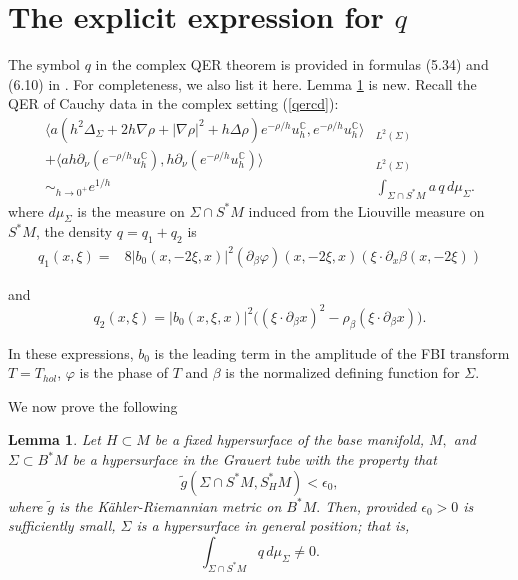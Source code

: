 \documentclass[11pt,reqno]{amsart}
\newtheorem{lemma}[theorem]{Lemma}
\theoremstyle{definition}
\begin{document}
\section{The explicit expression for $q$}
The symbol $q$ in the complex QER theorem is provided in formulas (5.34) and (6.10) in \cite{CT24}. For completeness, we also list it here.  Lemma \ref{general} is new. Recall the QER of Cauchy data in the complex setting (\ref{qercd}):
\begin{equation}
    \begin{split}
        \langle a(h^2\Delta_{\Sigma}+2h\nabla\rho+|\nabla\rho|^2+h\Delta\rho)e^{-\rho/h}u^{\mathbb{C}}_h,e^{-\rho/h}u^{\mathbb{C}}_h\rangle&_{L^2(\Sigma)}\\
        +\langle ah\partial_\nu (e^{-\rho/h}u^{\mathbb{C}}_h),h\partial_{\nu}(e^{-\rho/h}u^{\mathbb{C}}_h)\rangle&_{L^2(\Sigma)}\\
        \sim_{h\to 0^+}e^{1/h}&\int_{\Sigma\cap S^*M}a  \,q \,d\mu_{\Sigma}.
    \end{split}
\end{equation}
where $d\mu_{\Sigma}$ is the measure on $\Sigma\cap S^*M$ induced from the Liouville measure on $S^*M$, the density $q=q_1+q_2$ is
\begin{equation}\label{q1}
    \begin{split}
    q_1(x,\xi)=&8|b_0(x,-2\xi,x)|^2(\partial_{\beta}\varphi)(x,-2\xi,x)(\xi\cdot\partial_x\beta(x,-2\xi))
    \end{split}
\end{equation}



and
\begin{equation}\label{q2}
q_2(x,\xi)=|b_0(x,\xi,x)|^2\big((\xi\cdot\partial_{\beta}x)^2-\rho_{\beta}(\xi\cdot\partial_{\beta}x)\big).
\end{equation}

In these expressions, $b_0$ is the leading term in the amplitude of the FBI transform $T=T_{hol}$,  $\varphi$ is the phase of $T$ and $\beta$ is the normalized defining function for $\Sigma.$

We now prove the following 

\begin{lemma} \label{general}
Let $H \subset M$ be a fixed hypersurface of the base manifold, $M,$ and  $\Sigma \subset B^*M$ be a hypersurface in the Grauert tube with the property that
$$ \tilde{g}( \Sigma \cap S^*M, S_H^*M) < \epsilon_0,$$
where $\tilde{g}$ is the K\"ahler-Riemannian metric on $B^*M.$
Then, provided $\epsilon_0 >0$ is sufficiently small, $\Sigma$ is a hypersurface in general position; that is,
$$ \int_{\Sigma \cap S^*M} q \, d \mu_{\Sigma} \neq 0.$$
\end{lemma}
\end{document}
